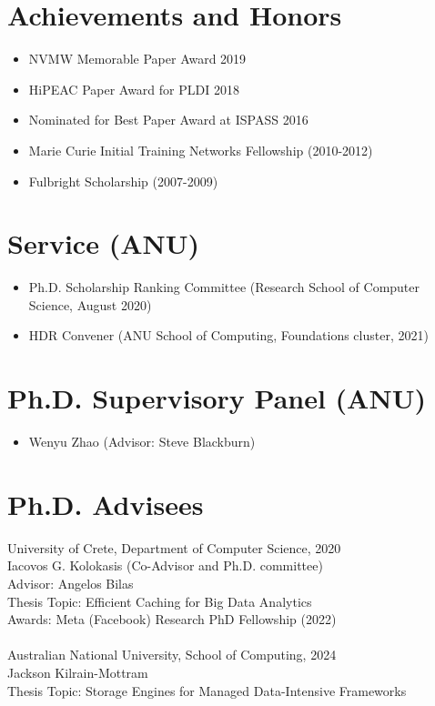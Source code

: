 \documentclass[singlecolumn,singlespace,11pt]{article}
\begin{document}
\section*{Achievements and Honors}
\begin{itemize}
\item NVMW Memorable Paper Award 2019
\item HiPEAC Paper Award for PLDI 2018 
\item Nominated for Best Paper Award at ISPASS 2016 
\item Marie Curie Initial Training Networks Fellowship (2010-2012)
\item Fulbright Scholarship (2007-2009)
\end{itemize}

\section*{Service (ANU)}

\begin{itemize}
\item Ph.D. Scholarship Ranking Committee (Research School of Computer Science, August 2020)
\item HDR Convener (ANU School of Computing, Foundations cluster, 2021)
\end{itemize}

\section*{Ph.D. Supervisory Panel (ANU)}

\begin{itemize}
\item Wenyu Zhao (Advisor: Steve Blackburn)
\end{itemize}

\section*{Ph.D. Advisees}
University of Crete, Department of Computer Science, 2020 \\
\indent Iacovos G. Kolokasis (Co-Advisor and Ph.D. committee) \\
\indent Advisor: Angelos Bilas \\ 
\indent Thesis Topic: Efficient Caching for Big Data Analytics \\ 
\indent Awards: Meta (Facebook) Research PhD Fellowship (2022)
\\
\\
Australian National University, School of Computing, 2024\\
\indent Jackson Kilrain-Mottram \\
\indent Thesis Topic: Storage Engines for Managed Data-Intensive Frameworks
\end{document}
